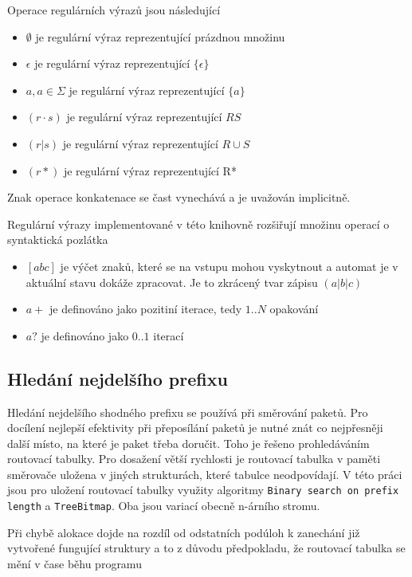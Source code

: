 Operace regulárních výrazů jsou následující

\begin{itemize}
	\item{$\emptyset$ je regulární výraz reprezentující prázdnou množinu}
	\item{$\epsilon$ je regulární výraz reprezentující $\{\epsilon\}$}
	\item{$a, a \in \Sigma$ je regulární výraz reprezentující $\{a\}$}
	\item{$(r \cdot s)$ je regulární výraz reprezentující $RS$}
	\item{$(r | s)$ je regulární výraz reprezentující $R \cup S$}
	\item{$(r*)$ je regulární výraz reprezentující R*}
\end{itemize}

Znak operace konkatenace %
se čast vynechává a je uvažován implicitně.

Regulární výrazy implementované v této knihovně rozšiřují množinu operací o syntaktická pozlátka

\begin{itemize}
	\item{$[abc]$ je výčet znaků, které se na vstupu mohou vyskytnout a automat je v aktuální stavu dokáže zpracovat. Je to zkrácený tvar zápisu $(a|b|c)$}
	\item{$a+$ je definováno jako pozitiní iterace, tedy $1..N$ opakování}
	\item{$a?$ je definováno jako $0..1$ iterací}
\end{itemize}

\subsection{Hledání nejdelšího prefixu}
Hledání nejdelšího shodného prefixu se používá při směrování paketů.
Pro docílení nejlepší efektivity při přeposílání paketů je nutné znát co nejpřesněji další místo, na které je paket třeba doručit.
Toho je řešeno prohledáváním routovací tabulky.
Pro dosažení větší rychlosti je routovací tabulka v paměti směrovače uložena v jiných strukturách, které tabulce neodpovídají.
V této práci jsou pro uložení routovací tabulky využity algoritmy {\tt Binary search on prefix length} a {\tt TreeBitmap}.
Oba jsou variací obecně n-árního stromu.

Při chybě alokace dojde na rozdíl od odstatních podúloh k zanechání již vytvořené fungující struktury
a to z důvodu předpokladu, že routovací tabulka se mění v čase běhu programu

